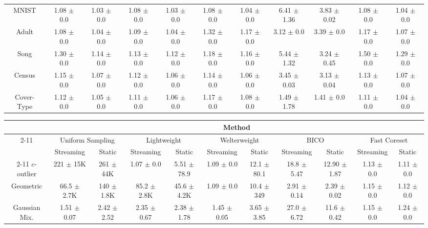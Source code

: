 \begin{table*}
\begin{tabular}{|c|cc|cc|cc|cc|cc|}
        MNIST & 1.08 $\pm$ 0.0 & 1.03 $\pm$ 0.0 & 1.08 $\pm$ 0.0 & 1.03 $\pm$ 0.0 & 1.08 $\pm$ 0.0 & 1.04 $\pm$ 0.0 & 6.41 $\pm$ 1.36 & 3.83 $\pm$ 0.02 & 1.08 $\pm$ 0.0 & 1.04 $\pm$ 0.0 \\
        Adult & 1.08 $\pm$ 0.0 & 1.04 $\pm$ 0.0 & 1.09 $\pm$ 0.0 & 1.04 $\pm$ 0.0 & 1.32 $\pm$ 0.0 & 1.17 $\pm$ 0.0 & 3.12 $\pm$ 0.0 & 3.39 $\pm$ 0.0 & 1.17 $\pm$ 0.0 & 1.07 $\pm$ 0.0 \\
        Song & 1.30 $\pm$ 0.0 & 1.14 $\pm$ 0.0 & 1.13 $\pm$ 0.0 & 1.12 $\pm$ 0.0 & 1.18 $\pm$ 0.0 & 1.16 $\pm$ 0.0 & 5.44 $\pm$ 1.32 & 3.24 $\pm$ 0.45 & 1.50 $\pm$ 0.0 & 1.29 $\pm$ 0.0 \\
        Census & 1.15 $\pm$ 0.0 & 1.07 $\pm$ 0.0 & 1.12 $\pm$ 0.0 & 1.06 $\pm$ 0.0 & 1.14 $\pm$ 0.0 & 1.06 $\pm$ 0.0 & 3.45 $\pm$ 0.03 & 3.13 $\pm$ 0.04 & 1.13 $\pm$ 0.0 & 1.07 $\pm$ 0.0 \\
        Cover-Type & 1.12 $\pm$ 0.0 & 1.05 $\pm$ 0.0 & 1.11 $\pm$ 0.0 & 1.06 $\pm$ 0.0 & 1.17 $\pm$ 0.0 & 1.08 $\pm$ 0.0 & 1.49 $\pm$ 1.78 & 1.41 $\pm$ 0.0 & 1.11 $\pm$ 0.0 & 1.04 $\pm$ 0.0 \\
        \hline
    \end{tabular}
    \caption{Distortion means and variances for different sample sizes across datasets for $k$-means; taken over 5 runs.}
    \label{tbl:distortion}
    \vspace*{0.1cm}
    \fontsize{7.74pt}{7.74pt}\selectfont
    \renewcommand{\arraystretch}{1.25}
    \begin{tabular}{|c|cc|cc|cc|cc|cc|}
        \hline
        & \multicolumn{10}{c|}{Method} \\
        \cline{2-11} & \multicolumn{2}{c|}{Uniform Sampling} & \multicolumn{2}{c|}{Lightweight} & \multicolumn{2}{c|}{Welterweight} & \multicolumn{2}{c|}{BICO} & \multicolumn{2}{c|}{Fast Coreset} \\
        & Streaming & Static & Streaming & Static & Streaming & Static & Streaming & Static & Streaming & Static \\
        \cline{2-11}
        $c$-outlier & 221 $\pm$ 15K & 261 $\pm$ 44K & 1.07 $\pm$ 0.0 & 5.51 $\pm$ 78.9 & 1.09 $\pm$ 0.0 & 12.1 $\pm$ 80.1 & 18.8 $\pm$ 5.47 & 12.90 $\pm$ 1.87 & 1.13 $\pm$ 0.0 & 1.11 $\pm$ 0.0 \\
        Geometric & 66.5 $\pm$ 2.7K & 140 $\pm$ 1.8K & 85.2 $\pm$ 2.8K & 45.6 $\pm$ 4.2K & 1.09 $\pm$ 0.0 & 10.4 $\pm$ 349 & 2.91 $\pm$ 0.14 & 2.39 $\pm$ 0.02 & 1.15 $\pm$ 0.0 & 1.12 $\pm$ 0.0 \\
        Gaussian Mix. & 1.51 $\pm$ 0.07 & 2.42 $\pm$ 2.52 & 2.35 $\pm$ 0.67 & 2.38 $\pm$ 1.78 & 1.45 $\pm$ 0.05 & 3.65 $\pm$ 3.85 & 27.0 $\pm$ 6.72 & 11.6 $\pm$ 0.42 & 1.15 $\pm$ 0.0 & 1.24 $\pm$ 0.0 \\

\end{tabular}
\end{table*}
